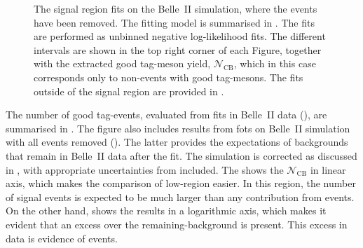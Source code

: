 \begin{figure}[htbp!]
{    }
    \caption{\label{fig:nosignal_fits_signal}
    The \EB signal region fits on the Belle~II simulation, where the \BtoXsdgamma events have been removed.
    The fitting model is summarised in .
    The fits are performed as unbinned negative log-likelihood fits.
    The different \EB intervals are shown in the top right corner of each Figure, 
    together with the extracted good tag-\B meson yield, $\mathcal{N}_{\mathrm{CB}}$, which in this case corresponds only to non-\BtoXsdgamma events with good tag-\B mesons.
    The fits outside of the signal region are provided in .
    }
\end{figure}

The number of good tag-\B events, evaluated from fits in Belle~II data (),
are summarised in .
The figure also includes results from fots on Belle~II simulation with all \BtoXsgamma events removed ().
The latter provides the expectations of \BB backgrounds that remain in Belle~II data after the fit.
The simulation is corrected as discussed in , with appropriate uncertainties from  included.
The  shows the $\mathcal{N}_{\mathrm{CB}}$ in linear axis, which makes the comparison of low-\EB region easier. 
In this region, the number of signal events is expected to be much larger than any contribution from \BtoXsgamma events.
On the other hand,  shows the results in a logarithmic axis, which makes it evident that an excess over the remaining-\BB background is present.
This excess in data is evidence of \BtoXsdgamma events.

